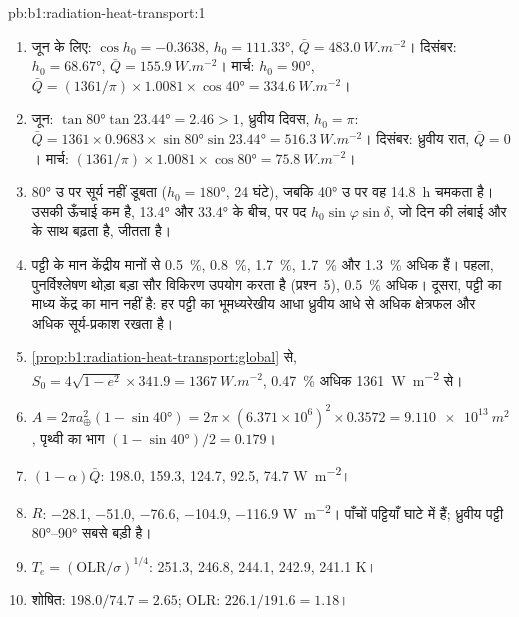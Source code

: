 \begin{solution}{pb:b1:radiation-heat-transport:1}
\begin{enumerate}
  \item जून के लिए: $\cos h_0 = -0.3638$, $h_0 = \ang{111.33}$, $\bar Q =
        \qty{483.0}{W.m^{-2}}$। दिसंबर: $h_0 = \ang{68.67}$, $\bar Q =
        \qty{155.9}{W.m^{-2}}$। मार्च: $h_0 = \ang{90}$, $\bar Q = (1361/\pi)
        \times 1.0081 \times \cos\ang{40} = \qty{334.6}{W.m^{-2}}$।
  \item जून: $\tan\ang{80}\tan\ang{23.44} = 2.46 > 1$, ध्रुवीय दिवस, $h_0 = \pi$:
        $\bar Q = 1361 \times 0.9683 \times \sin\ang{80}\sin\ang{23.44} =
        \qty{516.3}{W.m^{-2}}$। दिसंबर: ध्रुवीय रात, $\bar Q = 0$। मार्च:
        $(1361/\pi) \times 1.0081 \times \cos\ang{80} = \qty{75.8}{W.m^{-2}}$।
  \item \ang{80} उ पर सूर्य नहीं डूबता ($h_0 = \ang{180}$, 24 घंटे), जबकि
        \ang{40} उ पर वह \qty{14.8}{h} चमकता है। उसकी ऊँचाई कम है, \ang{13.4} और \ang{33.4} के बीच, पर पद $h_0\sin\varphi\sin\delta$, जो दिन की लंबाई और  के साथ बढ़ता है, जीतता है।
  \item पट्टी के मान केंद्रीय मानों से \qty{0.5}{\percent}, \qty{0.8}{\percent}, \qty{1.7}{\percent}, \qty{1.7}{\percent} और
        \qty{1.3}{\percent} अधिक हैं। पहला, पुनर्विश्लेषण थोड़ा बड़ा सौर विकिरण उपयोग करता है (प्रश्न~5), \qty{0.5}{\percent} अधिक। दूसरा, पट्टी का माध्य केंद्र का मान नहीं है: हर पट्टी का भूमध्यरेखीय आधा ध्रुवीय आधे से अधिक क्षेत्रफल और अधिक सूर्य-प्रकाश रखता है।
  \item \cref{prop:b1:radiation-heat-transport:global} से, $S_0 = 4\sqrt{1-e^2}
        \times 341.9 = \qty{1367}{W.m^{-2}}$, \qty{0.47}{\percent} अधिक \qty{1361}{W.m^{-2}} से।
  \item $A = 2\pi a_\oplus^2(1 - \sin\ang{40}) = 2\pi \times (6.371\times10^6)^2
        \times 0.3572 = \qty{9.110e13}{m^2}$, पृथ्वी का भाग $(1 - \sin\ang{40})/2 =
        0.179$।
  \item $(1 - \alpha)\bar Q$: \num{198.0}, \num{159.3}, \num{124.7}, \num{92.5},
        \num{74.7} \unit{W.m^{-2}}।
  \item $R$: \num{-28.1}, \num{-51.0}, \num{-76.6}, \num{-104.9}, \num{-116.9}
        \unit{W.m^{-2}}। पाँचों पट्टियाँ घाटे में हैं; ध्रुवीय पट्टी
        \ang{80}--\ang{90} सबसे बड़ी है।
  \item $T_e = (\text{OLR}/\sigma)^{1/4}$: \num{251.3}, \num{246.8}, \num{244.1},
        \num{242.9}, \num{241.1} \unit{K}।
  \item शोषित: $198.0/74.7 = 2.65$; OLR: $226.1/191.6 = 1.18$।

\end{enumerate}
\end{solution}
